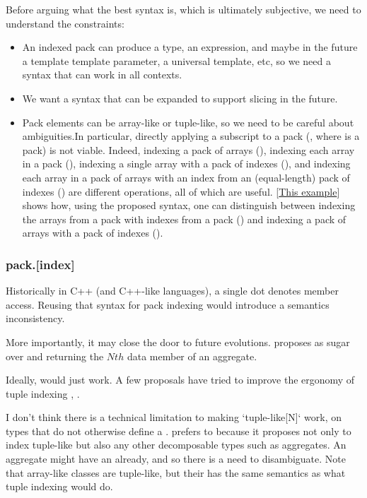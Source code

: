 \documentclass{wg21}
\begin{document}
Before arguing what the best syntax is, which is ultimately subjective, we need to understand the constraints:
\begin{itemize}
\item An indexed pack can produce a type, an expression, and maybe in the future a template template parameter, a universal template, etc, so we need a syntax
that can work in all contexts.
\item We want a syntax that can be expanded to support slicing in the future.
\item Pack elements can be array-like or tuple-like, so we need to be careful
  about ambiguities.In particular, directly applying a subscript to a pack
  (, where  is a pack) is not viable. Indeed, indexing a
  pack of arrays (), indexing each array in a pack
  (), indexing a single array with a pack of indexes
  (), and indexing each array in a pack of arrays
  with an index from an (equal-length) pack of indexes
  () are different operations, all of which are
  useful. [\href{https://compiler-explorer.com/z/E86h8eMG1}{This example}]
  shows how, using the proposed syntax, one can distinguish between indexing
  the arrays from a pack with indexes from a pack
  () and indexing a pack of arrays with a pack
  of indexes ().
\end{itemize}

\subsubsection{pack.[index]}

Historically in C++ (and C++-like languages), a single dot denotes member access.
Reusing that syntax for pack indexing would introduce a semantics inconsistency.

More importantly, it may close the door to future evolutions.
 proposes  as sugar over 
and  returning the $Nth$ data member of an aggregate.

Ideally,  would just work. A few proposals have tried to improve the ergonomy of tuple indexing
, .

I don't think there is a technical limitation to making `tuple-like[N]` work, on types that do not otherwise define a .
 prefers  to \tcode{[]} because it proposes not only to index tuple-like but also any other decomposable types such as aggregates.
An aggregate might have an  already, and so there is a need to disambiguate.
Note that array-like classes are tuple-like, but their  has the same semantics as what tuple indexing would do.
\end{document}
